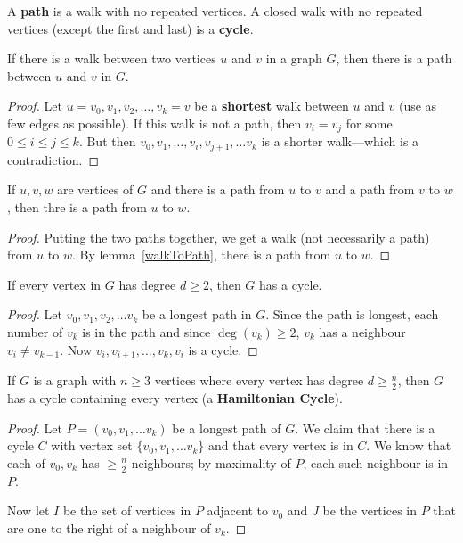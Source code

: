 \documentclass[12pt]{article}
\begin{document}
A {\bf path} is a walk with no repeated vertices. A closed walk with no repeated vertices (except the first and last) is a {\bf cycle}.

\begin{lemma}
\label{walkToPath}
If there is a walk between two vertices $u$ and $v$ in a graph $G$, then there is a path between $u$ and $v$ in $G$.
\end{lemma}

\begin{proof}
Let $u= v_0, v_1, v_2, \dots, v_k = v$ be a {\bf shortest} walk between $u$ and $v$ (use as few edges as possible). If this walk is not a path, then $v_i = v_j$ for some $0 \leq i \leq j \leq k$. But then $v_0, v_1, \dots, v_i, v_{j+1}, \dots v_k$ is a shorter walk---which is a contradiction.
\end{proof}

\begin{lemma}
\label{connectedPaths}
If $u,v,w$ are vertices of $G$ and there is a path from $u$ to $v$ and a path from $v$ to $w$, then thre is a path from $u$ to $w$.
\end{lemma}

\begin{proof}
Putting the two paths together, we get a walk (not necessarily a path) from $u$ to $w$. By lemma~\ref{walkToPath}, there is a path from $u$ to $w$.
\end{proof}

\begin{lemma}
If every vertex in $G$ has degree $d \geq 2$, then $G$ has a cycle.
\end{lemma}

\begin{proof}
Let $v_0, v_1, v_2, \dots v_k$ be a longest path in $G$. Since the path is longest, each number of $v_k$ is in the path and since $\deg(v_k) \geq 2$, $v_k$ has a neighbour $v_i \neq v_{k-1}$. Now $v_i, v_{i+1}, \dots, v_k, v_i$ is a cycle.
\end{proof}

\begin{theorem}[Dirac]
If $G$ is a graph with $n \geq 3$ vertices where every vertex has degree $d \geq \frac{n}{2}$, then $G$ has a cycle containing every vertex (a {\bf Hamiltonian Cycle}).
\end{theorem}

\begin{proof}
Let $P = (v_0, v_1, \dots v_k)$ be a longest path of $G$. We claim that there is a cycle $C$ with vertex set $\{v_0, v_1, \dots v_k\}$ and that every vertex is in $C$. We know that each of $v_0, v_k$ has $\geq \frac{n}{2}$ neighbours; by maximality of $P$, each such neighbour is in $P$.

Now let $I$ be the set of vertices in $P$ adjacent to $v_0$ and $J$ be the vertices in $P$ that are one to the right of a neighbour of $v_k$.
\end{proof}
\end{document}
